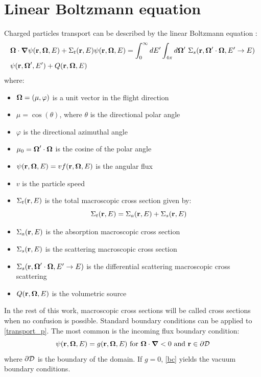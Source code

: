\section{Linear Boltzmann equation}
Charged particles transport can be described by the linear Boltzmann equation 
\cite{morel_81,galerkin_morel,cepxs}:
\begin{equation}
  \begin{split}
    & \bo\cdot \bn \psi(\br,\bo,E) + \Sigma_t(\br,E)\psi(\br,\bo,E) = 
    \int_0^{\infty}dE'\int_{4\pi}d\bo'\ \Sigma_s(\br,\bo'\cdot\bo,E'\rightarrow E)\\
    &\psi(\br,\bo',E')+Q(\br,\bo,E)
  \end{split}
\label{transport_p}
\end{equation}
where:
\begin{itemize}
\item $\boldsymbol{\Omega} = (\mu,\varphi)$ is a unit vector in the flight direction
\item $\mu = \cos(\theta)$, where $\theta$ is the directional polar angle
\item $\varphi$ is the directional azimuthal angle
\item $\mu_0 = \boldsymbol{\Omega}'\cdot \boldsymbol{\Omega}$ is the cosine of the polar angle
\item $\psi(\mathbf{r},\boldsymbol{\Omega},E) = vf(\mathbf{r},\boldsymbol{\Omega},E)$ is the angular flux
\item $v$ is the particle speed
\item $\Sigma_t(\mathbf{r},E)$ is the total macroscopic cross section given by:
\begin{equation}
\Sigma_t(\mathbf{r},E) = \Sigma_a(\mathbf{r},E)+\Sigma_s(\mathbf{r},E)
\end{equation}
\item $\Sigma_a(\mathbf{r},E)$ is the absorption macroscopic cross section
\item $\Sigma_s(\mathbf{r},E)$ is the scattering macroscopic cross section
\item $\Sigma_s(\mathbf{r},\boldsymbol{\Omega}'\cdot \boldsymbol{\Omega}, E'\rightarrow E)$ is the differential
scattering macroscopic cross scattering
\item $Q(\mathbf{r},\boldsymbol{\Omega},E)$ is the volumetric source
\end{itemize}
In the rest of this work, macroscopic cross sections will be called cross
sections when no confusion is possible. Standard boundary conditions can be
applied to \cref{transport_p}. The most common is the incoming flux boundary
condition:
\begin{equation}
\psi (\br,\bo,E) = g(\br,\bo,E) \textrm{ for }\bo \cdot \bn <0 \textrm{ and }
\br \in \partial \mc{D}
\label{bc}
\end{equation}
where $\partial \mathcal{D}$ is the boundary of the domain. If $g=0$, \cref{bc} yields 
the vacuum boundary conditions.

